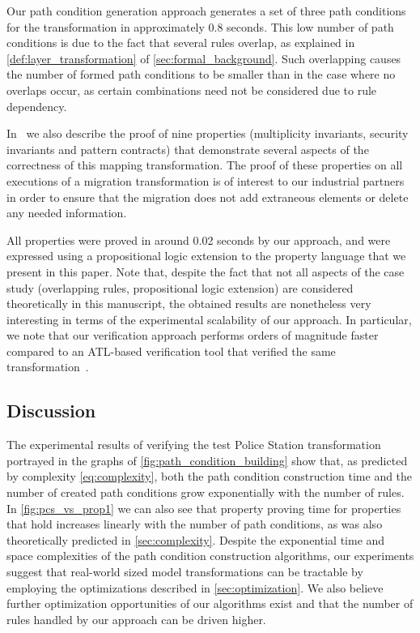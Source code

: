 Our path condition generation approach generates a set of three path conditions for the transformation in approximately 0.8 seconds. This low number of path conditions is
due to the fact that several rules overlap, as explained in \cref{def:layer_transformation} of \cref{sec:formal_background}. Such overlapping causes the number of formed path conditions to be smaller than in the case where no overlaps occur, as certain combinations need not be considered due to rule dependency.

In~\cite{conf/gg/SelimLCDO14} we also describe the proof of nine properties (multiplicity invariants, security invariants and pattern contracts) that demonstrate several aspects of the correctness of this mapping transformation. The proof of these properties on all executions of a migration transformation is of interest to our industrial partners in order to ensure that the migration does not add extraneous elements or delete any needed information.

All properties were proved in around 0.02 seconds by our approach, and were expressed using a propositional logic extension to the property language that we present in this paper. Note that, despite the fact that not all aspects of the case study (overlapping rules, propositional logic extension) are considered theoretically in this manuscript, the obtained results are nonetheless very interesting in terms of the experimental scalability of our approach. In particular, we note that our verification approach performs orders of magnitude faster compared to an ATL-based verification tool that verified the same transformation~\cite{conf/gg/SelimLCDO14}.

\subsection{Discussion}

The experimental results of verifying the test Police Station transformation
portrayed in the graphs of \cref{fig:path_condition_building} show that,
as predicted by complexity \cref{eq:complexity}, both the path condition
construction time and the number of created path conditions grow exponentially
with the number of rules.
In \cref{fig:pcs_vs_prop1} we can also see that property proving time for
properties that hold increases linearly with the number of path conditions, as
was also theoretically predicted in \cref{sec:complexity}. Despite the exponential time
and space complexities of the path condition construction algorithms, our
experiments suggest that real-world sized model transformations can be tractable
by employing the optimizations described in \cref{sec:optimization}.
We also believe further optimization opportunities of our algorithms exist and that the number of rules handled by our approach can be driven higher.

